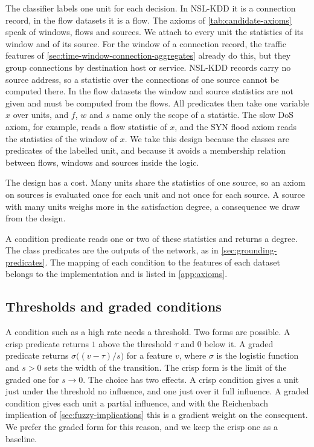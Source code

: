 The classifier labels one unit for each decision. In NSL-KDD it is a
connection record, in the flow datasets it is a flow. The axioms of
\cref{tab:candidate-axioms} speak of windows, flows and sources. We attach
to every unit the statistics of its window and of its source. For the window
of a connection record, the traffic features of
\cref{sec:time-window-connection-aggregates} already do this, but they group
connections by destination host or service. NSL-KDD records carry no source
address, so a statistic over the connections of one source cannot be
computed there. In the flow datasets the window and source statistics are
not given and must be computed from the flows. All predicates then take one variable $x$ over
units, and $f$, $w$ and $s$ name only the scope of a statistic. The slow DoS
axiom, for example, reads a flow statistic of $x$, and the SYN flood axiom
reads the statistics of the window of $x$. We take this design because the
classes are predicates of the labelled unit, and because it avoids a
membership relation between flows, windows and sources inside the logic.

The design has a cost. Many units share the statistics of one source, so an
axiom on sources is evaluated once for each unit and not once for each source.
A source with many units weighs more in the satisfaction degree, a
consequence we draw from the design.

A condition predicate reads one or two of these statistics and returns a
degree. The class predicates are the outputs of the network, as in
\cref{sec:grounding-predicates}. The mapping of each condition to the
features of each dataset belongs to the implementation and is listed in
\cref{app:axioms}.

\subsection{Thresholds and graded conditions}
\label{sec:fuzzification}

A condition such as a high rate needs a threshold. Two forms are possible. A
crisp predicate returns $1$ above the threshold $\tau$ and $0$ below it. A
graded predicate returns $\sigma\bigl((v-\tau)/s\bigr)$ for a feature $v$,
where $\sigma$ is the logistic function and $s>0$ sets the width of the
transition. The crisp form is the limit of the graded one for $s\to 0$. The
choice has two effects. A crisp condition gives a unit just under the
threshold no influence, and one just over it full influence. A graded
condition gives each unit a partial influence, and with the Reichenbach
implication of \cref{sec:fuzzy-implications} this is a gradient weight on the
consequent. We prefer the graded form for this reason, and we keep the crisp
one as a baseline.

